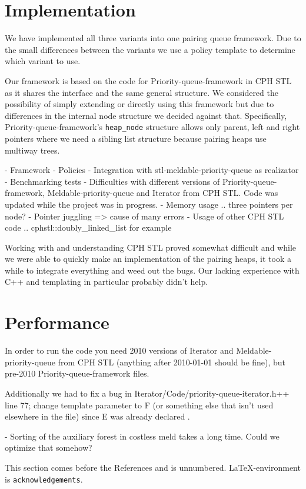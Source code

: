 \documentclass{DIKU-article}[2010/01/13]
\begin{document}
\section{Implementation}

We have implemented all three variants into one pairing queue framework. Due to
the small differences between the variants we use a policy template to determine
which variant to use. 

Our framework is based on the code for Priority-queue-framework in CPH STL as it
shares the interface and the same general structure. We considered the
possibility of simply extending or directly using this framework but due to
differences in the internal node structure we decided against that.
Specifically, Priority-queue-framework's \verb!heap_node! structure allows only
parent, left and right pointers where we need a sibling list structure because
pairing heaps use multiway trees.

- Framework
- Policies
- Integration with stl-meldable-priority-queue as realizator
- Benchmarking tests
- Difficulties with different versions of Priority-queue-framework,
  Meldable-priority-queue and Iterator from CPH STL. Code was updated while the
  project was in progress.
- Memory usage .. three pointers per node?
- Pointer juggling => cause of many errors
- Usage of other CPH STL code .. cphstl::doubly\_linked\_list for example

Working with and understanding CPH STL proved somewhat difficult and while we
were able to quickly make an implementation of the pairing heaps, it took a
while to integrate everything and weed out the bugs. Our lacking experience with
C++ and templating in particular probably didn't help.

\section{Performance}

In order to run the code you need 2010 versions of Iterator and
Meldable-priority-queue from CPH STL (anything after 2010-01-01 should be fine),
but pre-2010 Priority-queue-framework files.

Additionally we had to fix a bug in Iterator/Code/priority-queue-iterator.h++
line 77; change template parameter to F (or something else that isn't used
elsewhere in the file) since E was already declared .

- Sorting of the auxiliary forest in costless meld takes a long time. Could we
  optimize that somehow?

\begin{acknowledgements}
This section comes before the References and is unnumbered.
\LaTeX-en\-viron\-ment is \verb|acknowledgements|.
\end{acknowledgements}


\end{document}
